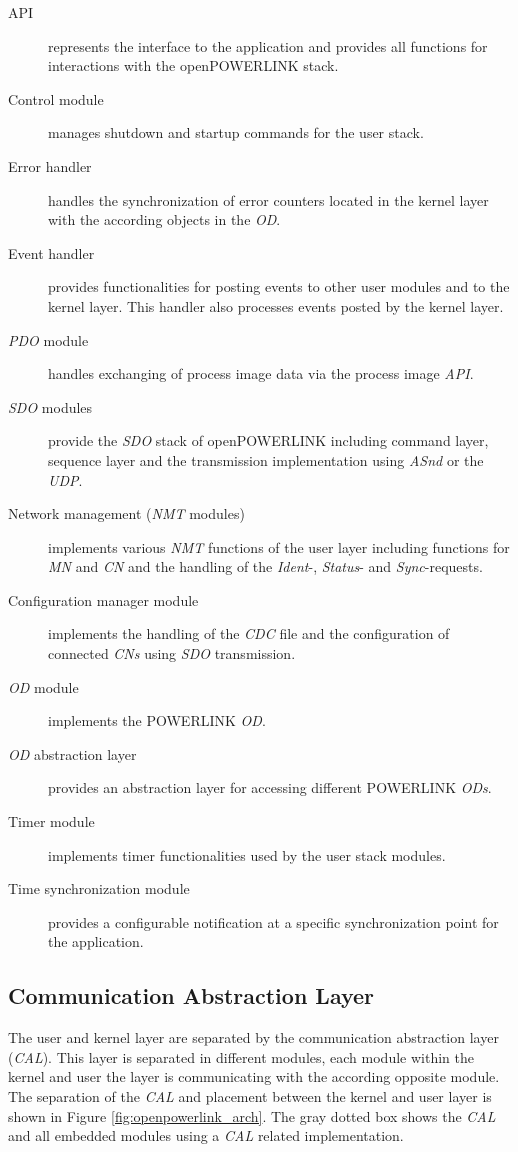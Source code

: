 \begin{description}
    \item[API] represents the interface to the application and provides all functions for interactions with the openPOWERLINK stack.
    \item[Control module] manages shutdown and startup commands for the user stack.
    \item[Error handler] handles the synchronization of error counters located in the kernel layer with the according objects in the \emph{OD}.
    \item[Event handler] provides functionalities for posting events to other user modules and to the kernel layer.
    This handler also processes events posted by the kernel layer.
    \item[\emph{PDO} module] handles exchanging of process image data via the process image \emph{API}.
    \item[\emph{SDO} modules] provide the \emph{SDO} stack of openPOWERLINK including command layer, sequence layer and the transmission implementation using \emph{ASnd} or the \emph{UDP}.
    \item[Network management (\emph{NMT} modules)] implements various \emph{NMT} functions of the user layer including functions for \emph{MN} and \emph{CN} and the handling of the \emph{Ident}-, \emph{Status}- and \emph{Sync}-requests.
    \item[Configuration manager module] implements the handling of the \emph{CDC} file and the configuration of connected \emph{CNs} using \emph{SDO} transmission.
    \item[\emph{OD} module] implements the POWERLINK \emph{OD}.
    \item[\emph{OD} abstraction layer] provides an abstraction layer for accessing different POWERLINK \emph{ODs}.
    \item[Timer module] implements timer functionalities used by the user stack modules.
    \item[Time synchronization module] provides a configurable notification at a specific synchronization point for the application.
\end{description}

\subsection{Communication Abstraction Layer}
\label{sec:oplk_architecture_cal}

The user and kernel layer are separated by the communication abstraction layer (\emph{CAL}).
This layer is separated in different modules, each module within the kernel and user the layer is communicating with the according opposite module.
The separation of the \emph{CAL} and placement between the kernel and user layer is shown in Figure \ref{fig:openpowerlink_arch}.
The gray dotted box shows the \emph{CAL} and all embedded modules using a \emph{CAL} related implementation.

